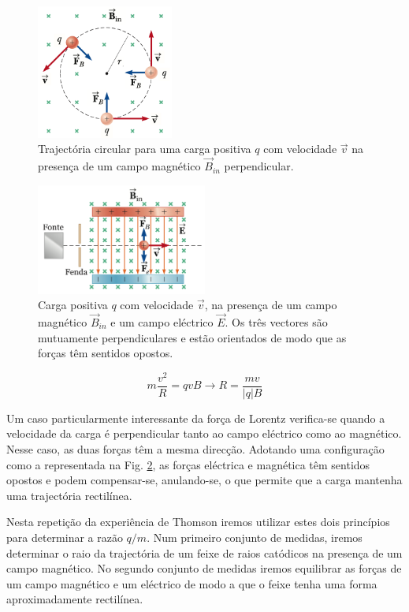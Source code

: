 \documentclass[a4paper,twoside,11pt]{report}      %
\begin{document}
\begin{figure}[t]
  \centering 
	\includegraphics[width=0.4\textwidth]{./Lorentz1.png} 
	\caption{Trajectória circular para uma carga positiva $q$ com velocidade $\vec{v}$ na presença de um campo magnético $\vec{B}_{in}$ perpendicular. \label{fig:lorentz1}} 
\end{figure}

\begin{figure}[b]
  \centering 
	\includegraphics[width=0.5\textwidth]{./Lorentz2.png} 
	\caption{ Carga positiva $q$ com velocidade $\vec{v}$, na presença de um campo magnético $\vec{B}_{in}$ e um campo eléctrico $\vec{E}$. Os três vectores são mutuamente perpendiculares e estão orientados de modo que as forças têm sentidos opostos. \label{fig:lorentz2}} 
\end{figure}

\begin{equation}
m\frac{v^2}{R}=qvB \rightarrow R=\frac{mv}{|q|B}
\end{equation}

Um caso particularmente interessante da força de Lorentz verifica-se quando a velocidade da carga é perpendicular tanto ao campo eléctrico como ao magnético. Nesse caso, as duas forças têm a mesma direcção. Adotando uma configuração como a representada na Fig. \ref{fig:lorentz2}, as forças eléctrica e magnética têm sentidos opostos e podem compensar-se, anulando-se, o que permite que a carga mantenha uma trajectória rectilínea.

Nesta repetição da experiência de Thomson iremos utilizar estes dois princípios para determinar a razão $q/m$. Num primeiro conjunto de medidas, iremos determinar o raio da trajectória de um feixe de raios catódicos na presença de um campo magnético. No segundo conjunto de medidas iremos equilibrar as forças de um campo magnético e um eléctrico de modo a que o feixe tenha uma forma aproximadamente rectilínea.
\end{document}
